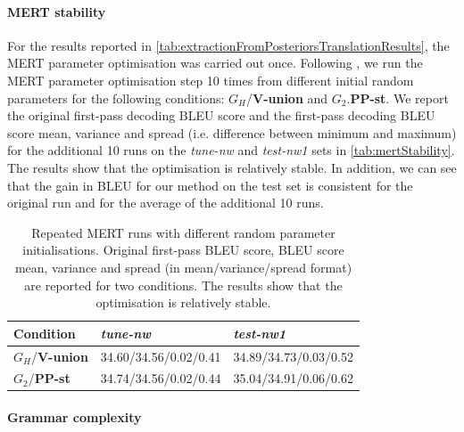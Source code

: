 
\paragraph{MERT stability}

For the results reported in \autoref{tab:extractionFromPosteriorsTranslationResults},
the MERT parameter optimisation was carried out once. Following
\citet{clark-dyer-lavie-smith:2011:ACL}, we run the MERT parameter optimisation
step 10 times from different initial random parameters for the following
conditions: $G_H$/\textbf{V-union} and $G_2$.\textbf{PP-st}. We report
the original first-pass decoding BLEU score and
the first-pass decoding BLEU score mean, variance and spread (i.e. difference between
minimum and maximum) for the additional 10 runs on the
\emph{tune-nw} and \emph{test-nw1} sets in \autoref{tab:mertStability}.
The results show that the optimisation is relatively stable. In addition, we can
see that the gain in BLEU for our method on the test set is consistent for
the original run and for the average of the additional 10 runs.
%
\begin{table}
  \begin{center}
    \begin{tabular}{*{3}{|l}|}
      \hline
      Condition & \emph{tune-nw} & \emph{test-nw1} \\
      \hline
      $G_H$/\textbf{V-union} & 34.60/34.56/0.02/0.41 & 34.89/34.73/0.03/0.52 \\
      \hline
      $G_2$/\textbf{PP-st}   & 34.74/34.56/0.02/0.44 & 35.04/34.91/0.06/0.62 \\
      \hline
    \end{tabular}
  \end{center}
  \caption{Repeated MERT runs with different random parameter initialisations. Original first-pass
    BLEU score, BLEU
    score mean, variance and spread (in mean/variance/spread format) are reported for two conditions. The results show that
    the optimisation is relatively stable.}
  \label{tab:mertStability}
\end{table}

\paragraph{Grammar complexity}

